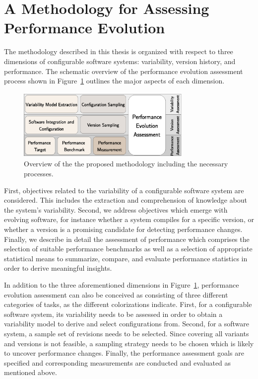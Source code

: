 \section{A Methodology for Assessing Performance Evolution}

The methodology described in this thesis is organized with respect to three
dimensions of configurable software systems: variability, version history, and
performance. The schematic overview of the performance evolution assessment
process shown in Figure~\ref{fig:overview} outlines the major aspects of each
dimension.

\begin{figure}[h!]
	\centering
	\includegraphics[width=0.75\textwidth]{images/process_overview.eps}
	\caption{Overview of the the proposed methodology including the necessary processes.}
	\label{fig:overview}
\end{figure}

First, objectives related to the variability of a configurable software system
are considered. This includes the extraction and comprehension of knowledge
about the system’s variability. Second, we address objectives which emerge with
evolving software, for instance whether a system compiles for a specific
version, or whether a version is a promising candidate for detecting
performance changes. Finally, we describe in detail the assessment of
performance which comprises the selection of suitable performance benchmarks as
well as a selection of appropriate statistical means to summarize, compare, and
evaluate performance statistics in order to derive meaningful insights.

In addition to the three aforementioned dimensions in Figure~\ref{fig:overview},
performance evolution assessment can also be conceived as consisting of three different
categories of tasks, as the different colorizations indicate. 
First, for a configurable software system, its variability needs to be
assessed in order to obtain a variability model to derive and
select configurations from.
Second, for a software system, a sample set of revisions needs to be selected.
Since covering all variants and versions is not feasible, a sampling strategy needs to be chosen
which is likely to uncover performance changes. Finally, the
performance assessment goals are specified and corresponding
measurements are conducted and evaluated as mentioned above.
